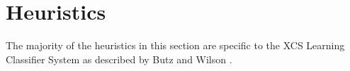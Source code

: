 \documentclass[a4paper, 11pt]{article}
\begin{document}
\section{Heuristics}
\label{sec:heuristics}
The majority of the heuristics in this section are specific to the XCS Learning Classifier System as described by Butz and Wilson \cite{Butz2002a}.
\end{document}
